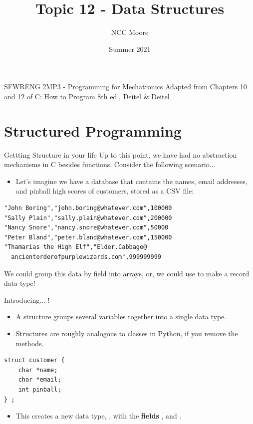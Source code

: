 \documentclass[11pt]{beamer}
\author{NCC Moore}
\title{Topic 12 - Data Structures}
\institute{McMaster University}
\date{Summer 2021}
\let\OldTexttt\texttt
\renewcommand{\texttt}[1]{\OldTexttt{\color{teal}{#1}}}
\begin{document}
\begin{frame}
\center
SFWRENG 2MP3 - Programming for Mechatronics
\titlepage
Adapted from Chapters 10 and 12 of C: How to Program 8th ed., Deitel \& Deitel
\end{frame}

\begin{frame}
\tableofcontents
\end{frame}

\section[struct]{Structured Programming}
\begin{frame}[fragile=singleslide]{Gettting Structure in your life}
Up to this point, we have had no abstraction mechanisms in C besides functions. Consider the following scenario...
\begin{itemize}
\item Let's imagine we have a database that contains the names, email addresses, and pinball high scores of customers, stored as a CSV file:
\end{itemize}
\begin{lstlisting}[style=terminal]
"John Boring","john.boring@whatever.com",100000
"Sally Plain","sally.plain@whatever.com",200000
"Nancy Snore","nancy.snore@whatever.com",50000
"Peter Bland","peter.bland@whatever.com",150000
"Thamarias the High Elf","Elder.Cabbage@
  ancientorderofpurplewizards.com",999999999
\end{lstlisting}
We could group this data by field into arrays, or, we could use \texttt{struct} to make a record data type!  
\end{frame}

\begin{frame}[fragile=singleslide]{Introducing... \texttt{struct}!}
\begin{itemize}
\item A structure groups several variables together into a single data type.
\item Structures are roughly analogous to classes in Python, if you remove the methods.
\end{itemize}
\begin{lstlisting}[style=C]
struct customer {
	char *name;
	char *email;
	int pinball;
} ; 
\end{lstlisting}
\begin{itemize}
\item This creates a new data type, \texttt{customer}, with the \textbf{fields} \texttt{name}, \texttt{email} and \texttt{pinball}.
\end{itemize}
\end{frame}
\end{document}

